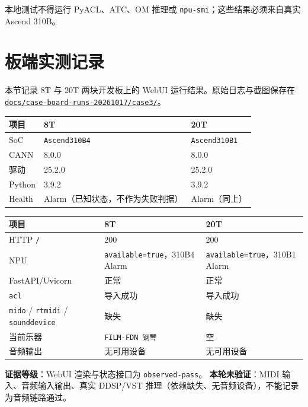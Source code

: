 本地测试不得运行 PyACL、ATC、OM 推理或
\passthrough{\lstinline!npu-smi!}；这些结果必须来自真实 Ascend 310B。

\section{板端实测记录}\label{src-experiment-case3-board-evidence}

本节记录 8T 与 20T 两块开发板上的 WebUI 运行结果。原始日志与截图保存在
\href{https://github.com/zhouxzh/Ascend310/blob/main/docs/case-board-runs-20261017/case3/README.md}{\passthrough{\lstinline!docs/case-board-runs-20261017/case3/!}}。

\begin{longtable}[]{@{}lll@{}}
\toprule\noalign{}
项目 & 8T & 20T \\
\midrule\noalign{}
\endhead
\bottomrule\noalign{}
\endlastfoot
SoC & \passthrough{\lstinline!Ascend310B4!} &
\passthrough{\lstinline!Ascend310B1!} \\
CANN & 8.0.0 & 8.0.0 \\
驱动 & 25.2.0 & 25.2.0 \\
Python & 3.9.2 & 3.9.2 \\
Health & Alarm（已知状态，不作为失败判据） & Alarm（同上） \\
\end{longtable}

\begin{longtable}[]{@{}lll@{}}
\toprule\noalign{}
项目 & 8T & 20T \\
\midrule\noalign{}
\endhead
\bottomrule\noalign{}
\endlastfoot
HTTP \passthrough{\lstinline!/!} & 200 & 200 \\
NPU & \passthrough{\lstinline!available=true!}，310B4 Alarm &
\passthrough{\lstinline!available=true!}，310B1 Alarm \\
FastAPI/Uvicorn & 正常 & 正常 \\
\passthrough{\lstinline!acl!} & 导入成功 & 导入成功 \\
\passthrough{\lstinline!mido!} / \passthrough{\lstinline!rtmidi!} /
\passthrough{\lstinline!sounddevice!} & 缺失 & 缺失 \\
当前乐器 & \passthrough{\lstinline!FILM-FDN 钢琴!} & 空 \\
音频输出 & 无可用设备 & 无可用设备 \\
\end{longtable}

\textbf{证据等级}：WebUI 渲染与状态接口为
\passthrough{\lstinline!observed-pass!}。 \textbf{本轮未验证}：MIDI
输入、音频输入输出、真实 DDSP/VST
推理（依赖缺失、无音频设备），不能记录为音频链路通过。

